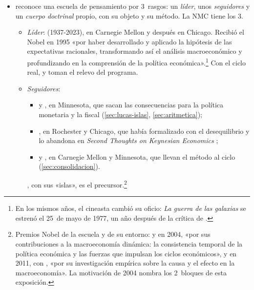 \documentclass[11pt]{article}
\begin{document}
\begin{itemize}
\item {} reconoce una escuela de pensamiento por 3~rasgos: un \emph{líder}, unos \emph{seguidores} y un \emph{cuerpo doctrinal} propio, con su objeto y su método\nocite{Schumpeter1954History}. La NMC tiene los 3.
  \begin{itemize}
  \item \emph{Líder}:  (1937-2023), en Carnegie Mellon y después en Chicago. Recibió el Nobel en 1995 «por haber desarrollado y aplicado la hipótesis de las expectativas racionales, transformando así el análisis macroeconómico y profundizando en la comprensión de la política económica»\nocite{NobelPrize1995Lucas}.\footnote{En los mismos años, el cineasta  cambió su oficio: \emph{La guerra de las galaxias} se estrenó el 25~de mayo de 1977\nocite{TCM2026StarWars}, un año después de la crítica de \nocite{Lucas1976Econometric}.} Con el ciclo real,  y  toman el relevo del programa.
  \item \emph{Seguidores}:
    \begin{itemize}
    \item {} y , en Minnesota, que sacan las consecuencias para la política monetaria y la fiscal (\ref{sec:lucas-islas}, \ref{sec:aritmetica});
    \item {}, en Rochester y Chicago, que había formalizado con  el desequilibrio\nocite{BarroGrossman1971General} y lo abandona en \emph{Second Thoughts on Keynesian Economics}\nocite{Barro1979Second} ;
    \item {} y , en Carnegie Mellon y Minnesota, que llevan el método al ciclo (\ref{sec:consolidacion}).
    \end{itemize}
  , con sus «islas», es el precursor\nocite{Phelps1970Microeconomic}.\footnote{Premios Nobel de la escuela y de su entorno:  y  en 2004, «por sus contribuciones a la macroeconomía dinámica: la consistencia temporal de la política económica y las fuerzas que impulsan los ciclos económicos»\nocite{Nobel2004KydlandPrescott}, y  en 2011, con , «por su investigación empírica sobre la causa y el efecto en la macroeconomía»\nocite{Nobel2011SargentSims}. La motivación de 2004 nombra los 2~bloques de esta exposición.}

\end{itemize}
\end{itemize}
\end{document}
